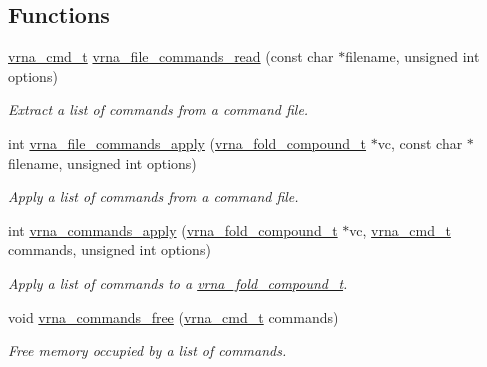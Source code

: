 \subsection*{Functions}
\begin{DoxyCompactItemize}
\item 
\hyperlink{group__command__files_gaf31afe4c5f8e4bf44a670ab4c3dcd916}{vrna\+\_\+cmd\+\_\+t} \hyperlink{group__command__files_gae5f56400ed43683338f7bf1c1102655a}{vrna\+\_\+file\+\_\+commands\+\_\+read} (const char $\ast$filename, unsigned int options)
\begin{DoxyCompactList}\small\item\em Extract a list of commands from a command file. \end{DoxyCompactList}\item 
int \hyperlink{group__command__files_gadbe8c9622f7bcc6dcbe3448b98df8656}{vrna\+\_\+file\+\_\+commands\+\_\+apply} (\hyperlink{group__fold__compound_ga1b0cef17fd40466cef5968eaeeff6166}{vrna\+\_\+fold\+\_\+compound\+\_\+t} $\ast$vc, const char $\ast$filename, unsigned int options)
\begin{DoxyCompactList}\small\item\em Apply a list of commands from a command file. \end{DoxyCompactList}\item 
int \hyperlink{group__command__files_gac65d0fe86f7671a2d2b85dda1a3ddc16}{vrna\+\_\+commands\+\_\+apply} (\hyperlink{group__fold__compound_ga1b0cef17fd40466cef5968eaeeff6166}{vrna\+\_\+fold\+\_\+compound\+\_\+t} $\ast$vc, \hyperlink{group__command__files_gaf31afe4c5f8e4bf44a670ab4c3dcd916}{vrna\+\_\+cmd\+\_\+t} commands, unsigned int options)
\begin{DoxyCompactList}\small\item\em Apply a list of commands to a \hyperlink{group__fold__compound_ga1b0cef17fd40466cef5968eaeeff6166}{vrna\+\_\+fold\+\_\+compound\+\_\+t}. \end{DoxyCompactList}\item 
void \hyperlink{group__command__files_ga3dc372dcbb43d2c4c91b5ef79b460428}{vrna\+\_\+commands\+\_\+free} (\hyperlink{group__command__files_gaf31afe4c5f8e4bf44a670ab4c3dcd916}{vrna\+\_\+cmd\+\_\+t} commands)
\begin{DoxyCompactList}\small\item\em Free memory occupied by a list of commands. \end{DoxyCompactList}\end{DoxyCompactItemize}


